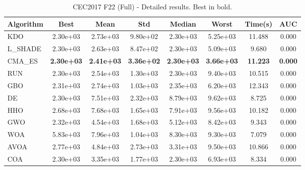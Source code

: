 \begin{table}[H]
\centering\small
\caption{CEC2017 F22 (Full) - Detailed results. Best in bold.}
\label{tab:cec2017_F22}
\begin{tabular}{lccccccc}
\toprule
\textbf{Algorithm} & \textbf{Best} & \textbf{Mean} & \textbf{Std} & \textbf{Median} & \textbf{Worst} & \textbf{Time(s)} & \textbf{AUC} \\
\midrule
KDO & 2.30e+03 & 2.73e+03 & 9.80e+02 & 2.30e+03 & 5.25e+03 & 11.488 & 0.000 \\
L_SHADE & 2.30e+03 & 2.63e+03 & 8.47e+02 & 2.30e+03 & 5.09e+03 & 9.680 & 0.000 \\
CMA_ES & \textbf{2.30e+03} & \textbf{2.41e+03} & \textbf{3.36e+02} & \textbf{2.30e+03} & \textbf{3.66e+03} & \textbf{11.223} & \textbf{0.000} \\
RUN & 2.30e+03 & 2.54e+03 & 1.30e+03 & 2.30e+03 & 9.40e+03 & 10.515 & 0.000 \\
GBO & 2.31e+03 & 2.74e+03 & 1.03e+03 & 2.35e+03 & 6.20e+03 & 12.343 & 0.000 \\
DE & 2.30e+03 & 7.51e+03 & 2.32e+03 & 8.79e+03 & 9.62e+03 & 8.725 & 0.000 \\
HHO & 2.68e+03 & 7.68e+03 & 1.65e+03 & 7.91e+03 & 9.56e+03 & 10.182 & 0.000 \\
GWO & 2.32e+03 & 4.54e+03 & 1.68e+03 & 5.12e+03 & 8.42e+03 & 9.343 & 0.000 \\
WOA & 5.83e+03 & 7.96e+03 & 1.04e+03 & 8.30e+03 & 9.30e+03 & 7.079 & 0.000 \\
AVOA & 2.77e+03 & 4.84e+03 & 2.73e+03 & 3.31e+03 & 9.50e+03 & 10.866 & 0.000 \\
COA & 2.30e+03 & 3.35e+03 & 1.77e+03 & 2.30e+03 & 6.93e+03 & 8.334 & 0.000 \\
\bottomrule
\end{tabular}
\end{table}
